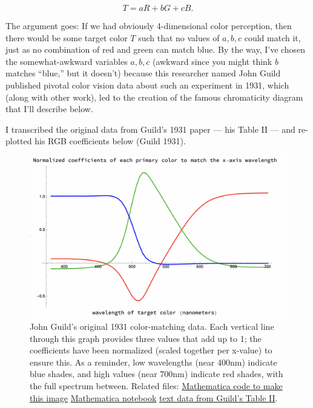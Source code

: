 \documentclass[
]{article}
\begin{document}
\[T = a R + b G + c B.\]

The argument goes: If we had obviously 4-dimensional color perception,
then there would be some target color \(T\) such that no values of
\(a,b,c\) could match it, just as no combination of red and green can
match blue. By the way, I've chosen the somewhat-awkward variables
\(a,b,c\) (awkward since you might think \(b\) matches ``blue,'' but it
doesn't) because this researcher named John Guild published pivotal
color vision data about such an experiment in 1931, which (along with
other work), led to the creation of the famous chromaticity diagram that
I'll describe below.

I transcribed the original data from Guild's 1931 paper --- his Table II
--- and re-plotted his RGB coefficients below (Guild 1931).

\begin{figure}
\centering
\begin{center}\includegraphics[width=1.0\textwidth]{img/color_matching_coeffs.png}\end{center}
\caption{John Guild's original 1931 color-matching data. Each vertical
line through this graph provides three values that add up to 1; the
coefficients have been normalized (scaled together per x-value) to
ensure this. As a reminder, low wavelengths (near 400nm) indicate blue
shades, and high values (near 700nm) indicate red shades, with the full
spectrum between. Related files:
\href{color_matching/plot_color_matching_coeffs.htm}{Mathematica code to
make this image} \textbar{}
\href{color_matching/plot_color_matching_coeffs.nb}{Mathematica
notebook} \textbar{}
\href{color_matching/guild_color_matching_data.math}{text data from
Guild's Table II}.}
\end{figure}
\end{document}
